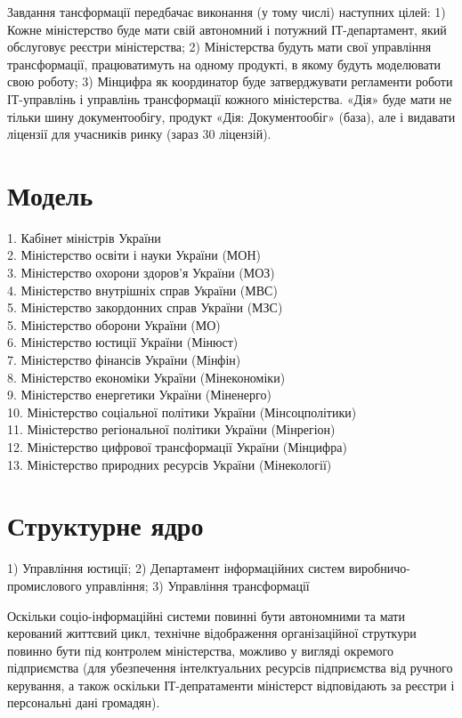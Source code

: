 Завдання тансформації передбачає виконання (у тому числі) наступних цілей:
1) Кожне міністерство буде мати свій автономний і потужний ІТ-департамент,
який обслуговує реєстри міністерства; 2) Міністерства будуть мати свої
управління трансформації, працюватимуть на одному продукті, в якому
будуть моделювати свою роботу; 3) Мінцифра як координатор буде затверджувати
регламенти роботи ІТ-управлінь і управлінь трансформації кожного міністерства.
«Дія» буде мати не тільки шину документообігу, продукт «Дія: Документообіг»
(база), але і видавати ліцензії для учасників ринку (зараз 30 ліцензій).

\section{Модель}

1. Кабінет міністрів України \\
2. Міністерство освіти і науки України (МОН) \\
3. Міністерство охорони здоров'я України (МОЗ) \\
4. Міністерство внутрішніх справ України (МВС) \\
5. Міністерство закордонних справ України (МЗС) \\
5. Міністерство оборони України (МО) \\
6. Міністерство юстиції України (Мінюст) \\
7. Міністерство фінансів України (Мінфін) \\
8. Міністерство економіки України (Мінекономіки) \\
9. Міністерство енергетики України (Міненерго) \\
10. Міністерство соціальної політики України (Мінсоцполітики) \\
11. Міністерство регіональної політики України (Мінрегіон) \\
12. Міністерство цифрової трансформації України (Мінцифра) \\
13. Міністерство природних ресурсів України (Мінекології) \\

\newpage
\section{Структурне ядро}

1) Управління юстиції;
2) Департамент інформаційних систем виробничо-промислового управління;
3) Управління трансформації

Оскільки соціо-інформаційні системи повинні бути автономними та мати
керований життєвий цикл, технічне відображення організаційної струткури
повинно бути під контролем міністерства, можливо у вигляді окремого
підприємства (для убезпечення інтелктуальних ресурсів підприємства
від ручного керування, а також оскільки ІТ-депратаменти міністерст
відповідають за реєстри і персональні дані громадян).

